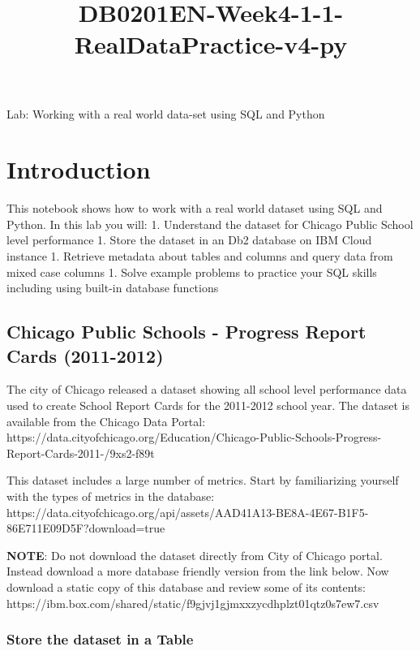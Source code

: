 \documentclass[11pt]{article}
\title{DB0201EN-Week4-1-1-RealDataPractice-v4-py}
\begin{document}
    
    \maketitle
    
    

    
    Lab: Working with a real world data-set using SQL and Python

    \hypertarget{introduction}{%
\section{Introduction}\label{introduction}}

This notebook shows how to work with a real world dataset using SQL and
Python. In this lab you will: 1. Understand the dataset for Chicago
Public School level performance 1. Store the dataset in an Db2 database
on IBM Cloud instance 1. Retrieve metadata about tables and columns and
query data from mixed case columns 1. Solve example problems to practice
your SQL skills including using built-in database functions

    \hypertarget{chicago-public-schools---progress-report-cards-2011-2012}{%
\subsection{Chicago Public Schools - Progress Report Cards
(2011-2012)}\label{chicago-public-schools---progress-report-cards-2011-2012}}

The city of Chicago released a dataset showing all school level
performance data used to create School Report Cards for the 2011-2012
school year. The dataset is available from the Chicago Data Portal:
https://data.cityofchicago.org/Education/Chicago-Public-Schools-Progress-Report-Cards-2011-/9xs2-f89t

This dataset includes a large number of metrics. Start by familiarizing
yourself with the types of metrics in the database:
https://data.cityofchicago.org/api/assets/AAD41A13-BE8A-4E67-B1F5-86E711E09D5F?download=true

\textbf{NOTE}: Do not download the dataset directly from City of Chicago
portal. Instead download a more database friendly version from the link
below. Now download a static copy of this database and review some of
its contents:
https://ibm.box.com/shared/static/f9gjvj1gjmxxzycdhplzt01qtz0s7ew7.csv

    \hypertarget{store-the-dataset-in-a-table}{%
\subsubsection{Store the dataset in a
Table}\label{store-the-dataset-in-a-table}}
\end{document}
